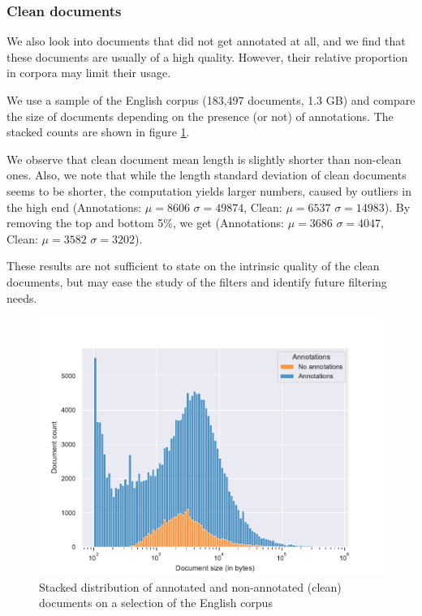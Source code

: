 \subsubsection{Clean documents}

We also look into documents that did not get annotated at all, and we find that these documents are usually of a high quality. However, their relative proportion in corpora may limit their usage.

We use a sample of the English corpus (183,497 documents, 1.3 GB) and compare the size of documents depending on the presence (or not) of annotations. The stacked counts are shown in figure \ref{clean_count}.

We observe that clean document mean length is slightly shorter than non-clean ones. Also, we note that while the length standard deviation of clean documents seems to be shorter, the computation yields larger numbers, caused by outliers in the high end (Annotations: $\mu=8606$ $\sigma=49874$, Clean: $\mu=6537$ $\sigma=14983$).
By removing the top and bottom 5\%, we get (Annotations: $\mu=3686$ $\sigma=4047$, Clean: $\mu=3582$ $\sigma=3202$).

These results are not sufficient to state on the intrinsic quality of the clean documents, but may ease the study of the filters and identify future filtering needs.

\begin{figure}[!ht]
    \begin{center}
        \includegraphics[width=\linewidth]{static/media/oscar/towards/num_doc_clean}
        \caption{Stacked distribution of annotated and non-annotated (clean) documents on a selection of the English corpus}
        \label{clean_count}
    \end{center}
\end{figure}

